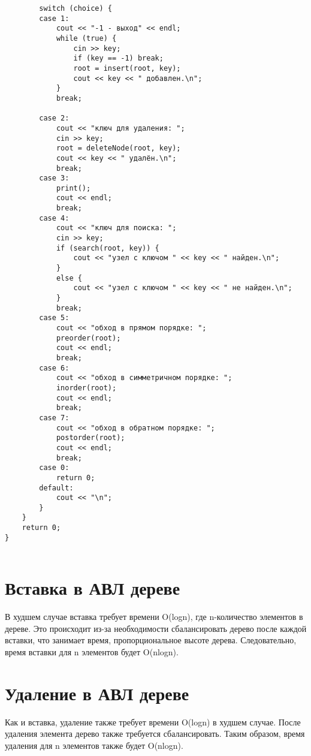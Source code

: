 \documentclass[bachelor, och, referat, times]{SCWorks}
\begin{document}
\begin{verbatim}
        switch (choice) {
        case 1:
            cout << "-1 - выход" << endl;
            while (true) {
                cin >> key;
                if (key == -1) break;
                root = insert(root, key);
                cout << key << " добавлен.\n";
            }
            break;

        case 2:
            cout << "ключ для удаления: ";
            cin >> key;
            root = deleteNode(root, key);
            cout << key << " удалён.\n";
            break;
        case 3:
            print();
            cout << endl;
            break;
        case 4:
            cout << "ключ для поиска: ";
            cin >> key;
            if (search(root, key)) {
                cout << "узел с ключом " << key << " найден.\n";
            }
            else {
                cout << "узел с ключом " << key << " не найден.\n";
            }
            break;
        case 5:
            cout << "обход в прямом порядке: ";
            preorder(root);
            cout << endl;
            break;
        case 6:
            cout << "обход в симметричном порядке: ";
            inorder(root);
            cout << endl;
            break;
        case 7:
            cout << "обход в обратном порядке: ";
            postorder(root);
            cout << endl;
            break;
        case 0:
            return 0;
        default:
            cout << "\n";
        }
    }
    return 0;
}
   

 \end{verbatim}


 \section{Вставка в АВЛ дереве}

 В худшем случае вставка требует времени O(logn), где n-количество элементов в дереве.
Это  происходит из-за необходимости сбалансировать дерево после каждой вставки, 
что занимает время, пропорциональное высоте дерева.
Следовательно, время вставки для n элементов будет O(nlogn).

 \section{Удаление в АВЛ дереве}

Как и вставка, удаление также требует времени O(logn) в худшем случае. 
После удаления элемента дерево также требуется сбалансировать.
Таким образом, время удаления для n элементов также будет O(nlogn).
\end{document}
